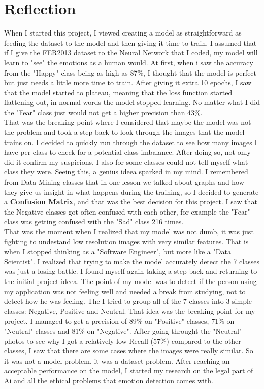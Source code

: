 \documentclass[12pt,a4paper]{article}
\begin{document}
\section{Reflection}
When I started this project, I viewed creating a model as straightforward as feeding the dataset to the model and then giving it time to train. I assumed that if I give the FER2013 dataset to the Neural Network that I coded, my model will learn to "see" the emotions as a human would. At first, when i saw the accuracy from the "Happy" class being as high as 87\%, I thought that the model is perfect but just needs a little more time to train. After giving it extra 10 epochs, I saw that the model started to plateau, meaning that the loss function started flattening out, in normal words the model stopped learning. No matter what I did the "Fear" class just would not get a higher precision than 43\%. \\
That was the breaking point where I considered that maybe the model was not the problem and took a step back to look through the images that the model trains on. I decided to quickly run through the dataset to see how many images I have per class to check for a potential class imbalance. After doing so, not only did it confirm my suspicions, I also for some classes could not tell myself what class they were. Seeing this, a genius ideea sparked in my mind. I remembered from Data Mining classes that in one lesson we talked about graphs and how they give us insight in what happens during the training, so I decided to generate a \textbf{Confusion Matrix}, and that was the best decision for this project. I saw that the Negative classes got often confused with each other, for example the "Fear" class was getting confused with the "Sad" class 216 times.\\
That was the moment when I realized that my model was not dumb, it was just fighting to undestand low resolution images with very similar features. That is when I stopped thinking as a "Software Engineer", but more like a "Data Scientist". I realized that trying to make the model accurately detect the 7 classes was just a losing battle. I found myself again taking a step back and returning to the initial project ideea. The point of my model was to detect if the person using my application was not feeling well and needed a break from studying, not to detect how he was feeling. The I tried to group all of the 7 classes into 3 simple classes: Negative, Positive and Neutral. That idea was the breaking point for my project. I managed to get a precision of 89\% on "Positive" classes, 71\% on "Neutral" classes and 81\% on "Negative". After going throught the "Neutral" photos to see why I got a relatively low Recall (57\%) compared to the other classes, I saw that there are some cases where the images were really similar. So it was not a model problem, it was a dataset problem. After reaching an acceptable performance on the model, I started my research on the legal part of Ai and all the ethical problems that emotion detection comes with.\\
\end{document}
